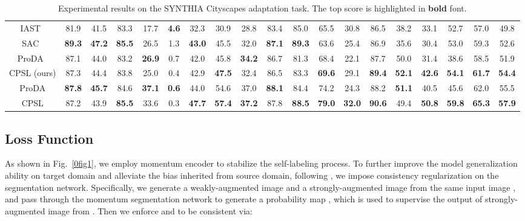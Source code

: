 \documentclass[10pt,twocolumn,letterpaper]{article}
\begin{document}
\begin{table*}[!ht]
{\begin{tabular}{c|cccccccccccccccc|c|c}
				IAST~\cite{mei2020instance}     & 81.9 & 41.5    & 83.3     & 17.7 & \textbf{4.6}   & 32.3 & 30.9  & 28.8 & 83.4       & 85.0 & 65.5   & 30.8  & 86.5 & 38.2 & 33.1      & 52.7 & 57.0 & 49.8 \\
				SAC~\cite{araslanov2021self}      & \textbf{89.3} & \textbf{47.2 }   & \textbf{85.5 }    & 26.5 & 1.3   & \textbf{43.0} & 45.5  & 32.0 & \textbf{87.1 }      & \textbf{89.3}	& 63.6   & 25.4  & 86.9 & 35.6 & 30.4      & 53.0 & 59.3 & 52.6 \\
				ProDA~\cite{zhang2021prototypical}      & 87.1 &44.0   &83.2    & \textbf{26.9} & 0.7   & 42.0 & 45.8 & \textbf{34.2} & 86.7      & 81.3	& 68.4   & 22.1  & 87.7 & 50.0 & 31.4      & 38.6 &58.5  & 51.9\\
CPSL (ours)    &   87.3   &    44.4     &    83.8      &   25.0   &   0.4    &   42.9   &   \textbf{47.5}    &   32.4   &     86.5       &    83.3  &    \textbf{69.6}    &   29.1    &   \textbf{89.4 }  &   \textbf{52.1}   &     \textbf{42.6 }     &  \textbf{ 54.1 }  &   \textbf{61.7}   &   \textbf{54.4 }  \\ 
				\midrule[1pt]
				ProDA & \textbf{87.8} 	&	\textbf{45.7}	&  84.6		& 	\textbf{37.1} 	&	\textbf{0.6} 	&	44.0	&	54.6	&	37.0	&	\textbf{88.1}	&	84.4	&	74.2	&	24.3	&	88.2	&	\textbf{51.1}	&	40.5	&	45.6	&  	62.0	&	55.5\\
				CPSL & 87.2 	&	43.9	&  \textbf{85.5}		& 	33.6 	&	0.3 	&	\textbf{47.7}	&	\textbf{57.4}	&	\textbf{37.2}	&	87.8	&	\textbf{88.5}	&	\textbf{79.0}	&	\textbf{32.0}	&	\textbf{90.6}	&	49.4	&	\textbf{50.8}	&	\textbf{59.8}	&  	\textbf{65.3}	&	\textbf{57.9}\\
				\bottomrule[1.5pt]
		\end{tabular}}
		\vspace{-0.5em}	
		\caption{Experimental results on the SYNTHIA  Cityscapes adaptation task. The top score is highlighted in {\bf bold} font.}
		\vspace{-1.0em}	
		\label{0tab2}
	\end{table*}
	
	
	\subsection{Loss Function}
	\label{sec3.5}
	As shown in Fig.~\ref{0fig1}, we employ momentum encoder to stabilize the self-labeling process. To further improve the model generalization ability on target domain and alleviate the bias inherited from source domain, following \cite{zhang2021prototypical,araslanov2021self}, we impose consistency regularization on the segmentation network. Specifically, we generate a weakly-augmented image  and a strongly-augmented image  from the same input image , and pass  through the momentum segmentation network  to generate a probability map , which is used to supervise the output  of strongly-augmented image  from . Then we enforce  and  to be consistent via:
	
\end{document}
